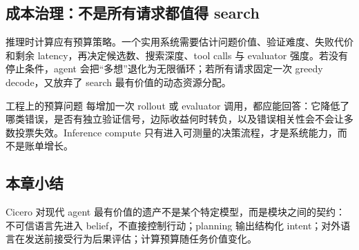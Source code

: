 \subsection{成本治理：不是所有请求都值得 search}

推理时计算应有预算策略。一个实用系统需要估计问题价值、验证难度、失败代价和剩余 latency，再决定候选数、搜索深度、tool calls 与 evaluator 强度。若没有停止条件，agent 会把“多想”退化为无限循环；若所有请求固定一次 greedy decode，又放弃了 search 最有价值的动态资源分配。

\begin{importantbox}{工程上的预算问题}
每增加一次 rollout 或 evaluator 调用，都应能回答：它降低了哪类错误，是否有独立验证信号，边际收益何时转负，以及错误相关性会不会让多数投票失效。Inference compute 只有进入可测量的决策流程，才是系统能力，而不是账单增长。
\end{importantbox}

\subsection{本章小结}

Cicero 对现代 agent 最有价值的遗产不是某个特定模型，而是模块之间的契约：不可信语言先进入 belief，不直接控制行动；planning 输出结构化 intent；对外语言在发送前接受行为后果评估；计算预算随任务价值变化。

